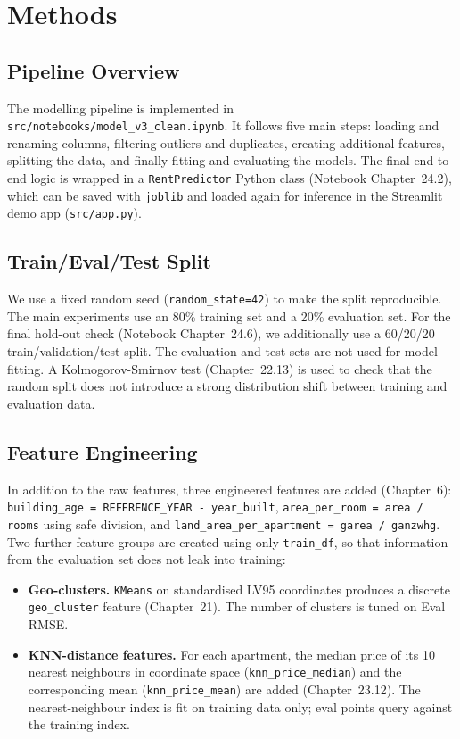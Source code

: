 \documentclass[11pt,a4paper]{article}
\begin{document}
\section{Methods}
\label{sec:methods}

\subsection{Pipeline Overview}
The modelling pipeline is implemented in \texttt{src/notebooks/model\_v3\_clean.ipynb}. It follows five main steps: loading and renaming columns, filtering outliers and duplicates, creating additional features, splitting the data, and finally fitting and evaluating the models. The final end-to-end logic is wrapped in a \texttt{RentPredictor} Python class (Notebook Chapter~24.2), which can be saved with \texttt{joblib} and loaded again for inference in the Streamlit demo app (\texttt{src/app.py}).

\subsection{Train/Eval/Test Split}
We use a fixed random seed (\texttt{random\_state=42}) to make the split reproducible. The main experiments use an 80\% training set and a 20\% evaluation set. For the final hold-out check (Notebook Chapter~24.6), we additionally use a 60/20/20 train/validation/test split. The evaluation and test sets are not used for model fitting. A Kolmogorov-Smirnov test (Chapter~22.13) is used to check that the random split does not introduce a strong distribution shift between training and evaluation data.

\subsection{Feature Engineering}
In addition to the raw features, three engineered features are added (Chapter~6):
\texttt{building\_age = REFERENCE\_YEAR - year\_built},
\texttt{area\_per\_room = area / rooms} using safe division, and
\texttt{land\_area\_per\_apartment = garea / ganzwhg}.
Two further feature groups are created using only \texttt{train\_df}, so that information from the evaluation set does not leak into training:

\begin{itemize}
    \item \textbf{Geo-clusters.} \texttt{KMeans} on standardised LV95 coordinates produces a discrete \texttt{geo\_cluster} feature (Chapter~21). The number of clusters is tuned on Eval RMSE.
    \item \textbf{KNN-distance features.} For each apartment, the median price of its 10 nearest neighbours in coordinate space (\texttt{knn\_price\_median}) and the corresponding mean (\texttt{knn\_price\_mean}) are added (Chapter~23.12). The nearest-neighbour index is fit on training data only; eval points query against the training index.
\end{itemize}
\end{document}
